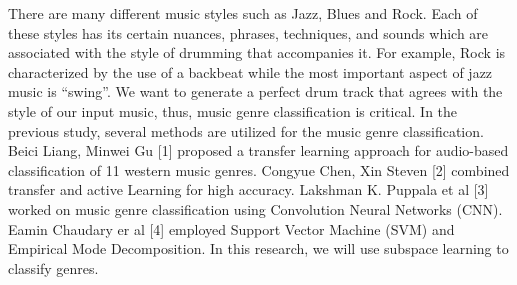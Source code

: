 \begin{par}
    \par \hspace{15pt} There are many different music styles such as Jazz, Blues and Rock. Each of these styles has its certain nuances, phrases, techniques, and sounds which are associated with the style of drumming that accompanies it. For example, Rock is characterized by the use of a backbeat while the most important aspect of jazz music is “swing”. We want to generate a perfect drum track that agrees with the style of our input music, thus, music genre classification is critical. In the previous study, several methods are utilized for the music genre classification. Beici Liang, Minwei Gu [1] proposed a transfer learning approach for audio-based classification of 11 western music genres. Congyue Chen, Xin Steven [2] combined transfer and active Learning for high accuracy. Lakshman K. Puppala et al [3] worked on music genre classification using Convolution Neural Networks (CNN). Eamin Chaudary er al [4] employed Support Vector Machine (SVM) and Empirical Mode Decomposition. In this research, we will use subspace learning to classify genres.
\end{par}
